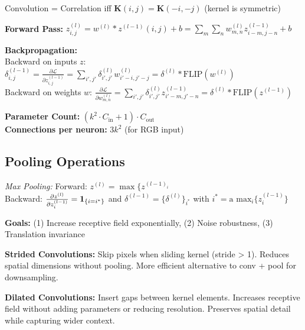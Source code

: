 \begin{highlightbox*}[gray!30]
Convolution = Correlation iff $\mathbf{K}(i,j) = \mathbf{K}(-i,-j)$ (kernel is symmetric)
\end{highlightbox*}



\textbf{Forward Pass:} $z_{i,j}^{(l)} = w^{(l)} * z^{(l-1)}(i,j) + b = \sum_m \sum_n w_{m,n}^{(l)} z_{i-m,j-n}^{(l-1)} + b$

\textbf{Backpropagation:}\\
{\small
Backward on inputs $z$: $\delta_{i,j}^{(l-1)} = \frac{\partial \mathcal{L}}{\partial z_{i,j}^{(l-1)}} = \sum_{i',j'} \delta_{i',j'}^{(l)} w_{i'-i,j'-j}^{(l)} = \delta^{(l)} * \text{FLIP}(w^{(l)})$\\
Backward on weights $w$: $\frac{\partial \mathcal{L}}{\partial w_{m,n}^{(l)}} = \sum_{i',j'} \delta_{i',j'}^{(l)} z_{i'-m,j'-n}^{(l-1)} = \delta^{(l)} * \text{FLIP}(z^{(l-1)})$
}


\textbf{Parameter Count:} $(k^2 \cdot C_{\text{in}} + 1) \cdot C_{\text{out}}$\\
\textbf{Connections per neuron:} $3k^2$ (for RGB input)


\subsection{Pooling Operations}

\emph{Max Pooling:} 
Forward: $z^{(l)} = \max\{z^{(l-1)_i}$\\
Backward: $\frac{\partial z^{(l)}}{\partial z^{(l-1)}_i} = \mathbf{1}_{\{i = i^*\}}$ and
$\delta^{(l-1)}=\{ \delta^{(l)}\}_{i^*}$ with {\small $i^* = \text{a max}_i\{ z^{(l-1)}_i \}$}

\textbf{Goals:} (1) Increase receptive field exponentially, (2) Noise robustness, (3) Translation invariance

\textbf{Strided Convolutions:} Skip pixels when sliding kernel (stride > 1). Reduces spatial dimensions without pooling. More efficient alternative to conv + pool for downsampling.

\textbf{Dilated Convolutions:} Insert gaps between kernel elements. Increases receptive field without adding parameters or reducing resolution. Preserves spatial detail while capturing wider context.

